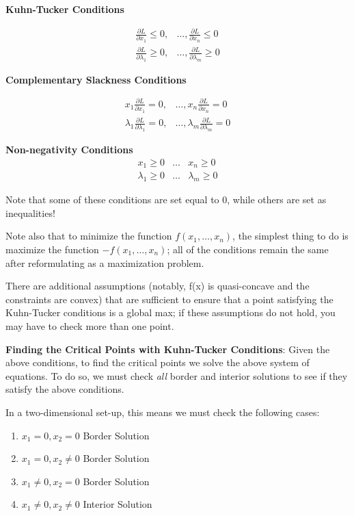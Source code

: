 \documentclass[
]{book}
\providecommand{\tightlist}{%
  \setlength{\itemsep}{0pt}\setlength{\parskip}{0pt}}
\theoremstyle{definition}
\theoremstyle{definition}
\theoremstyle{definition}
\theoremstyle{definition}
\theoremstyle{remark}
\begin{document}
\textbf{Kuhn-Tucker Conditions}

\begin{align*}
\frac{\partial L}{\partial x_1} \leq 0, & \dots, \frac{\partial L}{\partial x_n} \leq 0\\
\frac{\partial L}{\partial \lambda_1} \geq 0, & \dots, \frac{\partial L}{\partial \lambda_m} \geq 0
\end{align*}

\textbf{Complementary Slackness Conditions}

\begin{align*}
x_1\frac{\partial L}{\partial x_1} = 0, & \dots, x_n\frac{\partial L}{\partial x_n} = 0\\
\lambda_1\frac{\partial L}{\partial \lambda_1} = 0, & \dots, \lambda_m \frac{\partial L}{\partial \lambda_m} = 0
\end{align*}

\textbf{Non-negativity Conditions}
\begin{eqnarray*}
x_1 \geq 0 & \dots & x_n \geq 0\\
\lambda_1 \geq 0 & \dots & \lambda_m \geq 0
\end{eqnarray*}

Note that some of these conditions are set equal to 0, while others are set as inequalities!

Note also that to minimize the function \(f(x_1, \dots, x_n)\), the simplest thing to do is maximize the function \(-f(x_1, \dots, x_n)\); all of the conditions remain the same after reformulating as a maximization problem.

There are additional assumptions (notably, f(x) is quasi-concave and the constraints are convex) that are sufficient to ensure that a point satisfying the Kuhn-Tucker conditions is a global max; if these assumptions do not hold, you may have to check more than one point.

\textbf{Finding the Critical Points with Kuhn-Tucker Conditions}: Given the above conditions, to find the critical points we solve the above system of equations. To do so, we must check \textit{all} border and interior solutions to see if they satisfy the above conditions.

In a two-dimensional set-up, this means we must check the following cases:

\begin{enumerate}
\def\labelenumi{\arabic{enumi}.}
\tightlist
\item
  \(x_1 = 0, x_2 = 0\) Border Solution
\item
  \(x_1 = 0, x_2 \neq 0\) Border Solution
\item
  \(x_1 \neq 0, x_2 = 0\) Border Solution
\item
  \(x_1 \neq 0, x_2 \neq 0\) Interior Solution
\end{enumerate}
\end{document}
